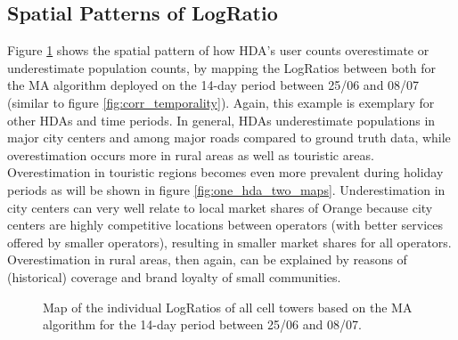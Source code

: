 \documentclass[a4paper]{article}
\begin{document}
\subsection{Spatial Patterns of LogRatio}

Figure \ref{fig:map_logratio} shows the spatial pattern of how HDA's user counts overestimate or underestimate population counts, by mapping the LogRatios between both for the MA algorithm deployed on the 14-day period between 25/06 and 08/07 (similar to figure \ref{fig:corr_temporality}). Again, this example is exemplary for other HDAs and time periods. In general, HDAs underestimate populations in major city centers and among major roads compared to ground truth data, while overestimation occurs more in rural areas as well as touristic areas. Overestimation in touristic regions becomes even more prevalent during holiday periods as will be shown in figure \ref{fig:one_hda_two_maps}. Underestimation in city centers can very well relate to local market shares of Orange because city centers are highly competitive locations between operators (with better services offered by smaller operators), resulting in smaller market shares for all operators. Overestimation in rural areas, then again, can be explained by reasons of (historical) coverage and brand loyalty of small communities. 


\begin{figure}[htpb!]
\centering
\caption{Map of the individual LogRatios of all cell towers based on the MA algorithm for the 14-day period between 25/06 and 08/07.}
\label{fig:map_logratio}
\end{figure}
\end{document}
